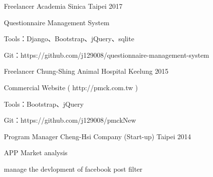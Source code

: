 

\begin{cventries}

  \cventry
    {Freelancer} %
    {Academia Sinica} %
    {Taipei} %
    {2017} %
    {
      \begin{cvitems} %
        \item {Questionnaire Management System}
        \item {Tools：Django、Bootstrap、jQuery、sqlite}
        \item {Git：https://github.com/j129008/questionnaire-management-system}
      \end{cvitems}
    }

  \cventry
    {Freelancer} %
    {Chung-Shing Animal Hospital} %
    {Keelung} %
    {2015} %
    {
      \begin{cvitems} %
      \item {Commercial Website ( http://pmck.com.tw )}
        \item {Tools：Bootstrap、jQuery}
        \item {Git：https://github.com/j129008/pmckNew}
      \end{cvitems}
    }

  \cventry
    {Program Manager} %
    {Cheng-Hsi Company (Start-up)} %
    {Taipei} %
    {2014} %
    {
      \begin{cvitems} %
        \item {APP Market analysis}
        \item {manage the devlopment of facebook post filter}
      \end{cvitems}
    }

\end{cventries}
